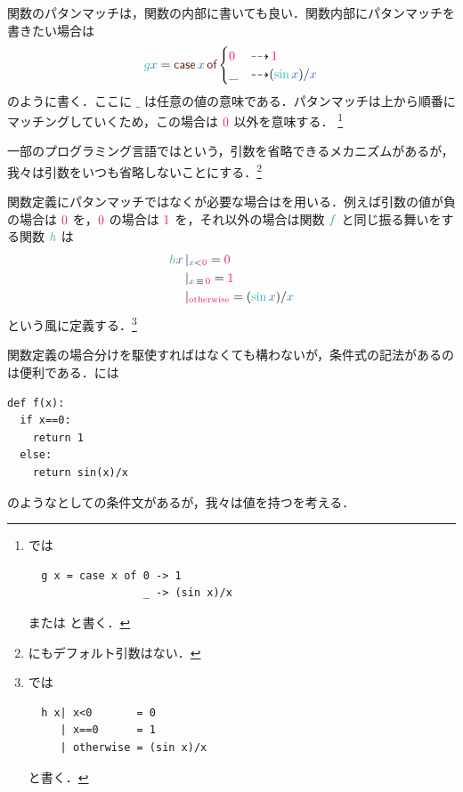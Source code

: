 \documentclass[a5paper,twoside,fleqn,draft]{jsbook}
\begin{document}
関数のパタンマッチは，関数の内部に書いても良い．関数内部にパタンマッチを書きたい場合は
\begin{equation}
  \hFunc{g}\hVar{x}=\hCaseSyntax{\hVar{x}}
  \begin{cases}
    \hConstant{0}&\hIfSo\hConstant{1}\\
    \_&\hIfSo(\hSin\hVar{x})/\hVar{x}
  \end{cases}
\end{equation}
のように書く．ここに $\_$ は任意の値の意味である．パタンマッチは上から順番にマッチングしていくため，この場合は $\hConstant{0}$ 以外を意味する．
\footnote{\haskell では
\begin{verbatim}
  g x = case x of 0 -> 1
                  _ -> (sin x)/x
\end{verbatim}
または  と書く．}

一部のプログラミング言語ではという，引数を省略できるメカニズムがあるが，我々は引数をいつも省略しないことにする．\footnote{\haskell にもデフォルト引数はない．}

\separator

関数定義にパタンマッチではなくが必要な場合はを用いる．例えば引数の値が負の場合は $\hConstant{0}$ を，$\hConstant{0}$ の場合は $\hConstant{1}$ を，それ以外の場合は関数 $\hFunc{f}$ と同じ振る舞いをする関数 $\hFunc{h}$ は
\begin{equation}
  \begin{aligned}
    \hFunc{h}\hVar{x}&\hGuard{\hVar{x}<\hConstant{0}}=\hConstant{0}\\
    &\hGuard{\hVar{x}\hIfEq\hConstant{0}}=\hConstant{1}\\
    &\hGuard{\hOtherwise}=(\hSin\hVar{x})/\hVar{x}
  \end{aligned}
\end{equation}
という風に定義する．\footnote{\haskell では
\begin{verbatim}
  h x| x<0       = 0
     | x==0      = 1
     | otherwise = (sin x)/x
\end{verbatim}
と書く．}

\separator

関数定義の場合分けを駆使すればはなくても構わないが，条件式の記法があるのは便利である．\python には
\begin{pythoncode}
\begin{verbatim}
def f(x):
  if x==0:
    return 1
  else:
    return sin(x)/x
\end{verbatim}
\end{pythoncode}
のようなとしての条件文があるが，我々は値を持つを考える．
\end{document}
